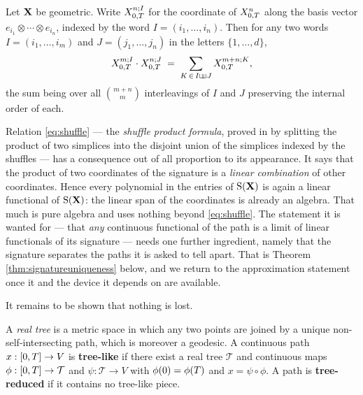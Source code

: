 \begin{proposition}\label{prop:shuffle}
Let $\mathbf{X}$ be geometric. Write $X^{n;I}_{0,T}$ for the coordinate of $X^{n}_{0,T}$ along the
basis vector $e_{i_1}\otimes\cdots\otimes e_{i_n}$, indexed by the word $I = (i_1,\dots,i_n)$. Then
for any two words $I = (i_1,\dots,i_m)$ and $J = (j_1,\dots,j_n)$ in
the letters $\{1,\dots,d\}$,
\begin{equation}\label{eq:shuffle}
X^{m;I}_{0,T}\cdot X^{n;J}_{0,T} \;=\; \sum_{K \,\in\, I \mathbin{\sqcup\mkern-6.5mu\sqcup} J} X^{m+n;K}_{0,T},
\end{equation}
the sum being over all $\binom{m+n}{m}$ interleavings of $I$ and $J$ preserving the internal order
of each. \qedopentext
\end{proposition}

Relation \eqref{eq:shuffle} --- the \emph{shuffle product formula}, proved in \cite[Lem.\ 1.15]{geng2021}
by splitting the product of two simplices into the disjoint union of the simplices indexed by the
shuffles --- has a consequence out of all proportion to its appearance. It says that the product of
two coordinates of the signature is a \emph{linear combination} of other coordinates. Hence every
polynomial in the entries of $\mathrm{S}(\mathbf{X})$ is again a linear functional of $\mathrm{S}(\mathbf{X})$: the linear
span of the coordinates is already an algebra. That much is pure algebra and uses nothing beyond
\eqref{eq:shuffle}. The statement it is wanted for --- that \emph{any} continuous functional of the
path is a limit of linear functionals of its signature --- needs one further ingredient, namely that
the signature separates the paths it is asked to tell apart. That is Theorem
\ref{thm:signatureuniqueness} below, and we return to the approximation statement once it and the
device it depends on are available.

It remains to be shown that nothing is lost.

\begin{definition}\label{def:treelike}
A \emph{real tree} is a metric space in which any two points are joined by a unique
non-self-intersecting path, which is moreover a geodesic. A continuous path $x:[0,T]\to V$ is
\textbf{tree-like} if there exist a real tree $\mathcal{T}$ and continuous maps
$\phi : [0,T]\to\mathcal{T}$ and $\psi:\mathcal{T}\to V$ with $\phi(0)=\phi(T)$ and
$x = \psi\circ\phi$. A path is \textbf{tree-reduced} if it contains no tree-like piece.
\end{definition}

